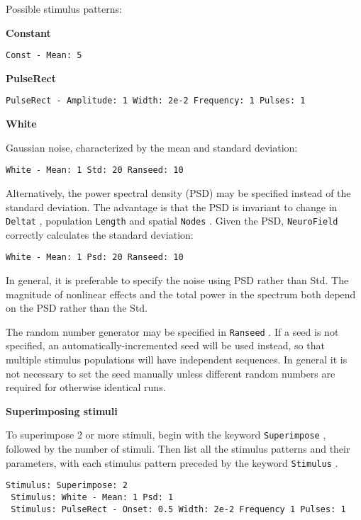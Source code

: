 \documentclass[12pt,a4paper]{article}
\newcommand{\type}[1]{{\small\small\tt #1} }
\newcommand{\NF}[0]{\type{NeuroField}}
\begin{document}
\begin{description}
\begin{itemize}
    Possible stimulus patterns:

    \vspace{5mm}
    \textbf{Constant}
    \begin{lstlisting}
Const - Mean: 5
    \end{lstlisting}

    \vspace{5mm}
    \textbf{PulseRect}
    \begin{lstlisting}
PulseRect - Amplitude: 1 Width: 2e-2 Frequency: 1 Pulses: 1
    \end{lstlisting}

    \vspace{5mm}
    \textbf{White}

    Gaussian noise, characterized by the mean and standard deviation:
    \begin{lstlisting}
White - Mean: 1 Std: 20 Ranseed: 10
    \end{lstlisting}

    Alternatively, the power spectral density (PSD) may be specified instead of the standard deviation. The advantage is that the PSD is invariant to change in \type{Deltat}, population \type{Length} and spatial \type{Nodes}. Given the PSD, \NF correctly calculates the standard deviation:
    \begin{lstlisting}
White - Mean: 1 Psd: 20 Ranseed: 10
    \end{lstlisting}

    In general, it is preferable to specify the noise using PSD rather than Std. The magnitude of nonlinear effects and the total power in the spectrum both depend on the PSD rather than the Std.

    The random number generator may be specified in \type{Ranseed}. If a seed is not specified, an automatically-incremented seed will be used instead, so that multiple stimulus populations will have independent sequences. In general it is not necessary to set the seed manually unless different random numbers are required for otherwise identical runs.

    \vspace{5mm}
    \textbf{Superimposing stimuli}

    To superimpose 2 or more stimuli, begin with the keyword \type{Superimpose}, followed by the number of stimuli. Then list all the stimulus patterns and their parameters, with each stimulus pattern preceded by the keyword \type{Stimulus}.
    \begin{lstlisting}
Stimulus: Superimpose: 2
 Stimulus: White - Mean: 1 Psd: 1
 Stimulus: PulseRect - Onset: 0.5 Width: 2e-2 Frequency 1 Pulses: 1
    \end{lstlisting}


\end{itemize}
\end{description}
\end{document}

